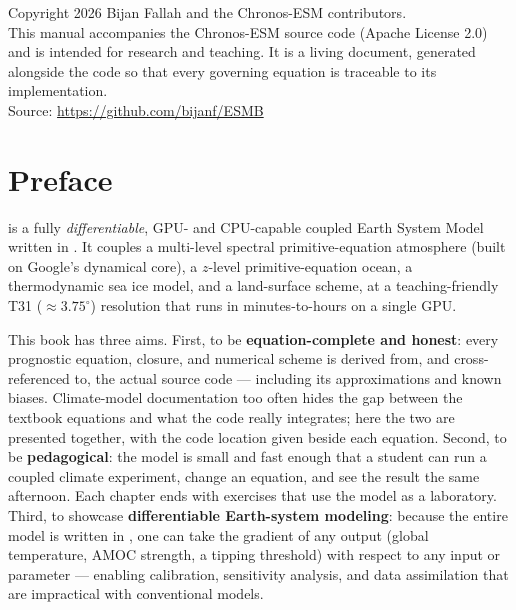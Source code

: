 \maketitle

\thispagestyle{empty}
\vspace*{\fill}
\noindent\small
Copyright \textcopyright{} 2026 Bijan Fallah and the Chronos-ESM contributors.\\
This manual accompanies the Chronos-ESM source code (Apache License 2.0) and is intended
for research and teaching. It is a living document, generated alongside the code so that
every governing equation is traceable to its implementation.\\[1em]
Source: \url{https://github.com/bijanf/ESMB}
\vspace*{\fill}
\clearpage

\chapter*{Preface}

\model{} is a fully \emph{differentiable}, GPU- and CPU-capable coupled Earth System Model
written in \jax{}. It couples a multi-level spectral primitive-equation atmosphere (built on
Google's \dino{} dynamical core), a $z$-level primitive-equation ocean, a thermodynamic sea
ice model, and a land-surface scheme, at a teaching-friendly T31 ($\approx 3.75^\circ$)
resolution that runs in minutes-to-hours on a single GPU.

This book has three aims. First, to be \textbf{equation-complete and honest}: every
prognostic equation, closure, and numerical scheme is derived from, and cross-referenced to,
the actual source code --- including its approximations and known biases. Climate-model
documentation too often hides the gap between the textbook equations and what the code really
integrates; here the two are presented together, with the code location given beside each
equation. Second, to be \textbf{pedagogical}: the model is small and fast enough that a
student can run a coupled climate experiment, change an equation, and see the result the same
afternoon. Each chapter ends with exercises that use the model as a laboratory. Third, to
showcase \textbf{differentiable Earth-system modeling}: because the entire model is written
in \jax{}, one can take the gradient of any output (global temperature, AMOC strength, a
tipping threshold) with respect to any input or parameter --- enabling calibration,
sensitivity analysis, and data assimilation that are impractical with conventional models.

